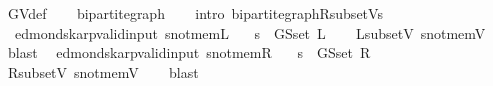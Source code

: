 \begin{isabellebody}
\ G{\isachardot}{\kern0pt}V{\isacharunderscore}{\kern0pt}def\isanewline
\ \ \isamarkupfalse%
\ bipartite{\isacharunderscore}{\kern0pt}graph\isanewline
\ \ \isamarkupfalse%
\ {\isacharparenleft}{\kern0pt}intro\ bipartite{\isacharunderscore}{\kern0pt}graph{\isachardot}{\kern0pt}R{\isacharunderscore}{\kern0pt}subset{\isacharunderscore}{\kern0pt}Vs{\isacharparenright}{\kern0pt}%
\endisatagproof
{\isafoldproof}%
%
\isadelimproof
\isanewline
%
\endisadelimproof
%
\isadeliminvisible
\isanewline
%
\endisadeliminvisible
%
\isataginvisible
{}\isamarkupfalse%
\ {\isacharparenleft}{\kern0pt}\ edmonds{\isacharunderscore}{\kern0pt}karp{\isacharunderscore}{\kern0pt}valid{\isacharunderscore}{\kern0pt}input{\isacharparenright}{\kern0pt}\ s{\isacharunderscore}{\kern0pt}not{\isacharunderscore}{\kern0pt}mem{\isacharunderscore}{\kern0pt}L{\isacharcolon}{\kern0pt}\isanewline
\ \ \ {\isachardoublequoteopen}s\ {\isasymnotin}\ G{\isachardot}{\kern0pt}S{\isachardot}{\kern0pt}set\ L{\isachardoublequoteclose}%
\endisataginvisible
{\isafoldinvisible}%
%
\isadeliminvisible
\isanewline
%
\endisadeliminvisible
%
\isadelimproof
\ \ %
\endisadelimproof
%
\isatagproof
{}\isamarkupfalse%
\ L{\isacharunderscore}{\kern0pt}subset{\isacharunderscore}{\kern0pt}V\ s{\isacharunderscore}{\kern0pt}not{\isacharunderscore}{\kern0pt}mem{\isacharunderscore}{\kern0pt}V\isanewline
\ \ \isamarkupfalse%
\ blast%
\endisatagproof
{\isafoldproof}%
%
\isadelimproof
\isanewline
%
\endisadelimproof
%
\isadeliminvisible
\isanewline
%
\endisadeliminvisible
%
\isataginvisible
{}\isamarkupfalse%
\ {\isacharparenleft}{\kern0pt}\ edmonds{\isacharunderscore}{\kern0pt}karp{\isacharunderscore}{\kern0pt}valid{\isacharunderscore}{\kern0pt}input{\isacharparenright}{\kern0pt}\ s{\isacharunderscore}{\kern0pt}not{\isacharunderscore}{\kern0pt}mem{\isacharunderscore}{\kern0pt}R{\isacharcolon}{\kern0pt}\isanewline
\ \ \ {\isachardoublequoteopen}s\ {\isasymnotin}\ G{\isachardot}{\kern0pt}S{\isachardot}{\kern0pt}set\ R{\isachardoublequoteclose}%
\endisataginvisible
{\isafoldinvisible}%
%
\isadeliminvisible
\isanewline
%
\endisadeliminvisible
%
\isadelimproof
\ \ %
\endisadelimproof
%
\isatagproof
{}\isamarkupfalse%
\ R{\isacharunderscore}{\kern0pt}subset{\isacharunderscore}{\kern0pt}V\ s{\isacharunderscore}{\kern0pt}not{\isacharunderscore}{\kern0pt}mem{\isacharunderscore}{\kern0pt}V\isanewline
\ \ \isamarkupfalse%
\ blast%
\endisatagproof
{\isafoldproof}%

\end{isabellebody}

